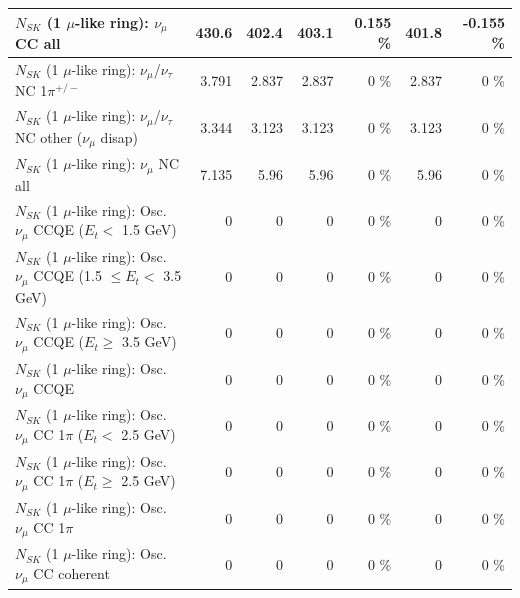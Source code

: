 \begin{table}
\begin{tabular}{| l | r | r | r  r | r  r |}
                                $N_{SK}$ (1 $\mu$-like ring): $\nu_{\mu}$ CC all &           430.6 &           402.4 &           403.1 &    0.155 \%  &           401.8 &   -0.155 \%  \\ 
\hline
              $N_{SK}$ (1 $\mu$-like ring): $\nu_\mu$/$\nu_\tau$ NC 1$\pi^{+/-}$ &           3.791 &           2.837 &           2.837 &        0 \%  &           2.837 &        0 \%  \\ 
   $N_{SK}$ (1 $\mu$-like ring): $\nu_\mu$/$\nu_\tau$ NC other ($\nu_\mu$ disap) &           3.344 &           3.123 &           3.123 &        0 \%  &           3.123 &        0 \%  \\ 
                                $N_{SK}$ (1 $\mu$-like ring): $\nu_{\mu}$ NC all &           7.135 &            5.96 &            5.96 &        0 \%  &            5.96 &        0 \%  \\ 
\hline
\hline
           $N_{SK}$ (1 $\mu$-like ring): Osc. $\nu_\mu$ CCQE ($E_{t} <$ 1.5 GeV) &               0 &               0 &               0 &        0 \%  &               0 &        0 \%  \\ 
  $N_{SK}$ (1 $\mu$-like ring): Osc. $\nu_\mu$ CCQE (1.5 $\leq E_{t} <$ 3.5 GeV) &               0 &               0 &               0 &        0 \%  &               0 &        0 \%  \\ 
        $N_{SK}$ (1 $\mu$-like ring): Osc. $\nu_\mu$ CCQE ($E_{t} \geq$ 3.5 GeV) &               0 &               0 &               0 &        0 \%  &               0 &        0 \%  \\ 
\hline
                               $N_{SK}$ (1 $\mu$-like ring): Osc. $\nu_\mu$ CCQE &               0 &               0 &               0 &        0 \%  &               0 &        0 \%  \\ 
\hline
      $N_{SK}$ (1 $\mu$-like ring): Osc. $\nu_\mu$ CC 1$\pi$ ($E_{t} <$ 2.5 GeV) &               0 &               0 &               0 &        0 \%  &               0 &        0 \%  \\ 
   $N_{SK}$ (1 $\mu$-like ring): Osc. $\nu_\mu$ CC 1$\pi$ ($E_{t} \geq$ 2.5 GeV) &               0 &               0 &               0 &        0 \%  &               0 &        0 \%  \\ 
\hline
                          $N_{SK}$ (1 $\mu$-like ring): Osc. $\nu_\mu$ CC 1$\pi$ &               0 &               0 &               0 &        0 \%  &               0 &        0 \%  \\ 
                        $N_{SK}$ (1 $\mu$-like ring): Osc. $\nu_\mu$ CC coherent &               0 &               0 &               0 &        0 \%  &               0 &        0 \%  \\ 

\end{tabular}
\end{table}
